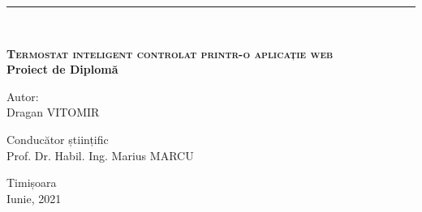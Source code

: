 \begin{titlepage}
    \noindent\rule{\textwidth}{1pt}\\[5cm]
    
    \begin{center}
        {\huge \bfseries \textsc{Termostat inteligent controlat printr-o aplicație web}}\\[2cm]
        {\large \bfseries Proiect de Diplomă}\\[2cm]
        \begin{flushright}
            \large
            Autor:\\
	      Dragan VITOMIR\\[1cm]
        \end{flushright}
        \begin{flushleft}
            \large
            Conducător științific\\
            Prof. Dr. Habil. Ing. Marius MARCU\\[2cm]
        \end{flushleft}
        {\small Timișoara \\Iunie, 2021}
    \end{center}
\end{titlepage}
\restoregeometry
\shipout\null